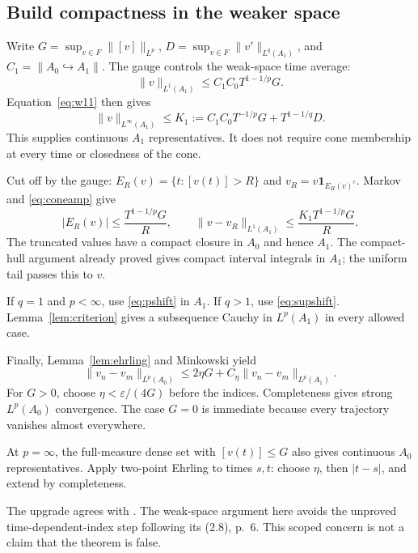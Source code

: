 \documentclass[12pt,reqno]{amsart}
\begin{document}
\subsection{Build compactness in the weaker space}

Write $G=\sup_{v\in F}\|[v]\|_{L^p}$, $D=\sup_{v\in F}\|v'\|_{L^q(A_1)}$, and $C_1=\|A_0\hookrightarrow A_1\|$. The gauge controls the weak-space time average:
\[
\|v\|_{L^1(A_1)}\le C_1C_0T^{1-1/p}G.
\]
Equation~\eqref{eq:w11} then gives
\begin{equation}\label{eq:coneamp}
\|v\|_{L^\infty(A_1)}\le K_1:=C_1C_0T^{-1/p}G+T^{1-1/q}D.
\end{equation}
This supplies continuous $A_1$ representatives. It does not require cone membership at every time or closedness of the cone.

Cut off by the gauge: $E_R(v)=\{t:[v(t)]>R\}$ and $v_R=v\mathbf1_{E_R(v)^c}$. Markov and \eqref{eq:coneamp} give
\begin{equation}\label{eq:conetail}
|E_R(v)|\le\frac{T^{1-1/p}G}{R},\qquad
\|v-v_R\|_{L^1(A_1)}\le\frac{K_1T^{1-1/p}G}{R}.
\end{equation}
The truncated values have a compact closure in $A_0$ and hence $A_1$. The compact-hull argument already proved gives compact interval integrals in $A_1$; the uniform tail passes this to $v$.

If $q=1$ and $p<\infty$, use \eqref{eq:pshift} in $A_1$. If $q>1$, use \eqref{eq:supshift}. Lemma~\ref{lem:criterion} gives a subsequence Cauchy in $L^p(A_1)$ in every allowed case.

Finally, Lemma~\ref{lem:ehrling} and Minkowski yield
\begin{equation}\label{eq:coneupgrade}
\|v_n-v_m\|_{L^p(A_0)}
\le2\eta G+C_\eta\|v_n-v_m\|_{L^p(A_1)}.
\end{equation}
For $G>0$, choose $\eta<\varepsilon/(4G)$ before the indices. Completeness gives strong $L^p(A_0)$ convergence. The case $G=0$ is immediate because every trajectory vanishes almost everywhere.

At $p=\infty$, the full-measure dense set with $[v(t)]\le G$ also gives continuous $A_0$ representatives. Apply two-point Ehrling to times $s,t$: choose $\eta$, then $|t-s|$, and extend by completeness.

The upgrade agrees with \cite[equation (2.22), pp.~12--13]{S-barrett-suli}. The weak-space argument here avoids the unproved time-dependent-index step following its (2.8), p.~6. This scoped concern is not a claim that the theorem is false.
\end{document}
